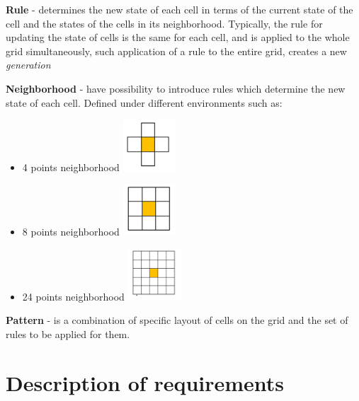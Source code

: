 \documentclass{article}
\begin{document}
\Large {\bf Rule
} 
	- determines the new state of each cell in terms of the current state
	of the cell and the states of the cells in its neighborhood.
	Typically, the rule for updating the state of cells is the same for each
	cell, and is applied to the whole grid simultaneously, such application of
	a rule to the entire grid, creates a new \textit{generation} \\

\newpage	

\Large {\bf Neighborhood
} 
	-  have possibility to introduce rules which determine the new state of 
	each cell. Defined under different environments such as:
	\begin{itemize}
	
	\item	
		4 points neighborhood \hspace{35pt} 
			 \includegraphics[width=20mm]{images/4_neigh.png} \\

	\item	
		8 points neighborhood \hspace{35pt}
			\includegraphics[width=20mm]{images/8_neigh.png} \\

	\item	
		24 points neighborhood \hspace{35pt}
			\includegraphics[width=20mm]{images/24_neigh.png} \\				
	\end{itemize}

\Large {\bf Pattern
} - is a combination of specific layout of cells on the grid and the set of rules to be applied for them.




\section{Description of requirements}
\end{document}
